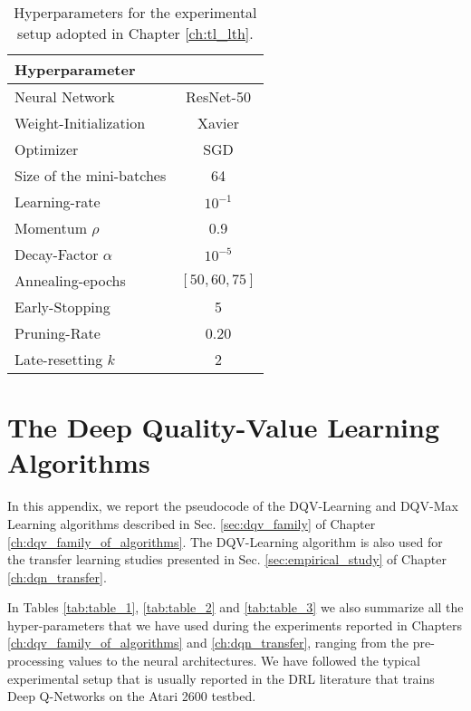 \begin{table}[H]
\centering
\begin{tabular}{l | c |  }
Hyperparameter \\
\hline \hline
Neural Network & ResNet-50 \\ 
Weight-Initialization & Xavier \\
Optimizer & SGD \\
Size of the mini-batches & 64 \\ 
Learning-rate & $10^{-1}$ \\
Momentum $\rho$ & 0.9 \\
Decay-Factor $\alpha$ & $10^{-5}$ \\
Annealing-epochs & $[50,60,75]$\\
Early-Stopping & 5 \\ 
Pruning-Rate & 0.20 \\
Late-resetting $k$ & 2 \\ 
\end{tabular}
\caption{Hyperparameters for the experimental setup adopted in Chapter \ref{ch:tl_lth}.}
\label{tab:hyperparameters}
\end{table}



\chapter{The Deep Quality-Value Learning Algorithms}\label{ch:appendixDQV}

In this appendix, we report the pseudocode of the DQV-Learning and DQV-Max Learning algorithms described in Sec. \ref{sec:dqv_family} of Chapter \ref{ch:dqv_family_of_algorithms}. The DQV-Learning algorithm is also used for the transfer learning studies presented in Sec. \ref{sec:empirical_study} of Chapter \ref{ch:dqn_transfer}. 

In Tables \ref{tab:table_1}, \ref{tab:table_2} and \ref{tab:table_3} we also summarize all the hyper-parameters that we have used during the experiments reported in Chapters \ref{ch:dqv_family_of_algorithms} and \ref{ch:dqn_transfer}, ranging from the pre-processing values to the neural architectures. We have followed the typical experimental setup that is usually reported in the DRL literature \cite{mnih2015human, van2015deep, wang2016dueling, castro2018dopamine, sabatelli2020deep} that trains Deep Q-Networks on the Atari 2600 testbed.

